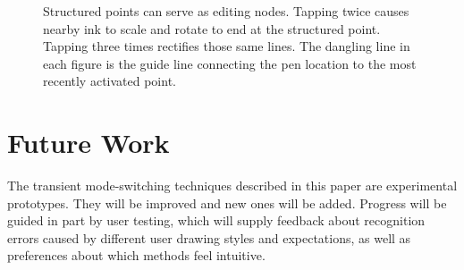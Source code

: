 \documentclass{egpubl}
\begin{document}
\begin{figure}
  \centering {}
\hspace{0.2cm} 
\hspace{0.2cm} 
  \caption{Structured points can serve as editing nodes. Tapping twice
    causes nearby ink to scale and rotate to end at the structured
    point. Tapping three times rectifies those same lines. The
    dangling line in each figure is the guide line connecting the pen
    location to the most recently activated point. }
  \label{fig:struct}
\end{figure}

\section{Future Work}

The transient mode-switching techniques described in this paper are
experimental prototypes. They will be improved and new ones will be
added. Progress will be guided in part by user testing, which will
supply feedback about recognition errors caused by different user
drawing styles and expectations, as well as preferences about which
methods feel intuitive.
\end{document}
